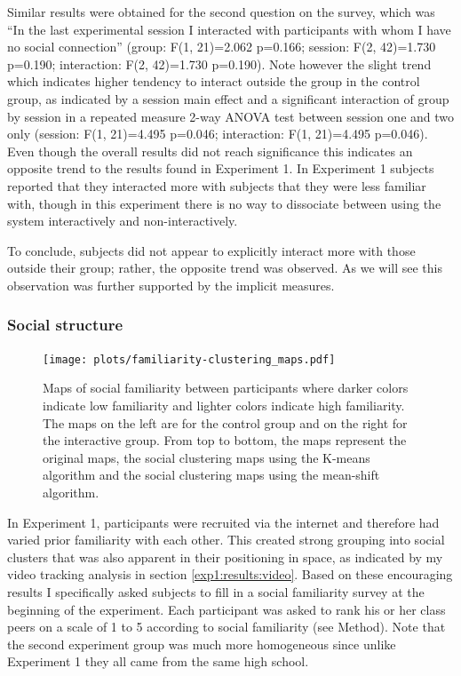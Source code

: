 \documentclass[a4paper,11pt]{article}
\begin{document}
{Similar results were obtained for the second question on the survey, which was ``In the last experimental session I interacted with participants with whom I have no social connection'' (group: F(1, 21)=2.062 p=0.166; session: F(2, 42)=1.730 p=0.190; interaction: F(2, 42)=1.730 p=0.190).
Note however the slight trend which indicates higher tendency to interact outside the group in the control group, as indicated by a session main effect and a significant interaction of group by session in a repeated measure 2-way ANOVA test between session one and two only (session: F(1, 21)=4.495 p=0.046; interaction: F(1, 21)=4.495 p=0.046).
Even though the overall results did not reach significance this indicates an opposite trend to the results found in Experiment 1.
In Experiment 1 subjects reported that they interacted more with subjects that they were less familiar with, though in this experiment there is no way to dissociate between using the system interactively and non-interactively.

To conclude, subjects did not appear to explicitly interact more with those outside their group;
rather, the opposite trend was observed.
As we will see this observation was further supported by the implicit measures.

\subsubsection{Social structure}\label{results:social_structure}

\begin{figure}[!htb]
    \centering
    \texttt{[image: plots/familiarity-clustering\_maps.pdf]}
    \caption{Maps of social familiarity between participants where darker colors indicate low familiarity and lighter colors indicate high familiarity. The maps on the left are for the control group and on the right for the interactive group. From top to bottom, the maps represent the original maps, the social clustering maps using the K-means algorithm and the social clustering maps using the mean-shift algorithm.}\label{plot:familiarity-clustering_maps}
\end{figure}

In Experiment 1, participants were recruited via the internet and therefore had varied prior familiarity with each other.
This created strong grouping into social clusters that was also apparent in their positioning in space, as indicated by my video tracking analysis in section \ref{exp1:results:video}.
Based on these encouraging results I specifically asked subjects to fill in a social familiarity survey at the beginning of the experiment.
Each participant was asked to rank his or her class peers on a scale of 1 to 5 according to social familiarity (see Method).
Note that the second experiment group was much more homogeneous since unlike Experiment 1 they all came from the same high school.

}
\end{document}
